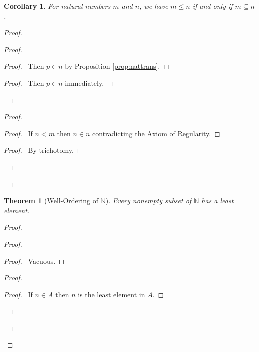 \documentclass{book}
\let\qed\relax
\newtheorem{cor}{Corollary}[ax]
\newtheorem{thm}[ax]{Theorem}
\theoremstyle{definition}
\begin{document}
\begin{cor}
For natural numbers $m$ and $n$, we have $m \leq n$ if and only if $m \subseteq n$.
\end{cor}

\begin{proof}
	\pf
	\begin{proof}
		\begin{proof}
			\pf\ Then $p \in n$ by Proposition \ref{prop:nattrans}.
		\end{proof}
		\begin{proof}
			\pf\ Then $p \in n$ immediately.
		\end{proof}
	\end{proof}
	\begin{proof}
		\begin{proof}
			\pf\ If $n < m$ then $n \in n$ contradicting the Axiom of Regularity.
		\end{proof}
		\begin{proof}
			\pf\ By trichotomy.
		\end{proof}
	\end{proof}
	\qed
\end{proof}

\begin{thm}[Well-Ordering of $\mathbb{N}$]
Every nonempty subset of $\mathbb{N}$ has a least element.
\end{thm}

\begin{proof}
\pf
{}
\begin{proof}
	\begin{proof}
		\pf\ Vacuous.
	\end{proof}
	\begin{proof}
		\begin{proof}
			\pf\ If $n \in A$ then $n$ is the least element in $A$.
		\end{proof}
	\end{proof}
\end{proof}
\qed
\end{proof}
\end{document}

